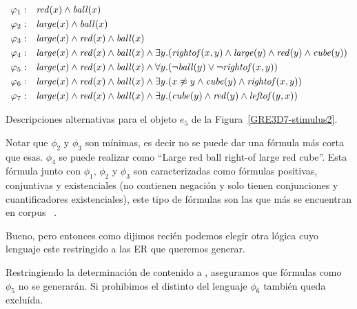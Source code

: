 \begin{table}
$$
\begin{array}{cl}
 \varphi_1: & \mathit{red}(x) \land \mathit{ball}(x)\\[3pt]
 \varphi_2: & \mathit{large}(x) \land \mathit{ball}(x)\\[3pt]
 \varphi_3: & \mathit{large}(x) \land \mathit{red}(x) \land \mathit{ball}(x)\\[3pt]
 \varphi_4: & \mathit{large}(x) \land \mathit{red}(x) \land \mathit{ball}(x) \land
   \exists y . (\mathit{rightof}(x,y) \land \mathit{large}(y) \land \mathit{red}(y) \land \mathit{cube}(y))\\[3pt]
 \varphi_5: & \mathit{large}(x) \land \mathit{red}(x) \land \mathit{ball}(x) \land
  \forall y . (\neg \mathit{ball}(y) \lor \neg \mathit{rightof}(x,y))\\[3pt]
 \varphi_6: & \mathit{large}(x) \land \mathit{red}(x) \land \mathit{ball}(x) \land
  \exists y . (x \not\approx y \land \mathit{cube}(y) \land \mathit{rightof}(x,y))\\[3pt]
 \varphi_7: & \mathit{large}(x) \land \mathit{red}(x) \land \mathit{ball}(x) \land
  \exists y . (\mathit{cube}(y) \land \mathit{red}(y) \land \mathit{leftof}(y,x))
 \end{array}
$$
\caption{Descripciones alternativas para el objeto $e_5$ de la Figura~\ref{GRE3D7-stimulus2}.}\label{tab:phis}
\end{table}

Notar que $\phi_2$ y $\phi_3$ son m\'inimas, es decir no se puede dar una f\'ormula m\'as corta que esas.
$\phi_4$ se puede realizar como ``Large red ball right-of large red cube''. Esta f\'ormula junto con $\phi_1$, $\phi_2$ y $\phi_3$ son caracterizadas como f\'ormulas positivas, conjuntivas y existenciales (no contienen negaci\'on y solo tienen conjunciones y cuantificadores existenciales), este tipo de f\'ormulas son las que m\'as se encuentran en corpus ~\cite{viethen06:_algor_for_gener_refer_expres,deemter06:_build_seman_trans_corpus_for,gre3d3}.

Bueno, pero entonces como dijimos reci\'en podemos elegir otra l\'ogica cuyo lenguaje este restringido a las ER que queremos generar.

Restringiendo la determinaci\'on de contenido a \EPFOL, aseguramos que f\'ormulas como  $\phi_5$ no se generar\'an. 
Si prohibimos el distinto del lenguaje  $\phi_6$ tambi\'en queda exclu\'ida.




